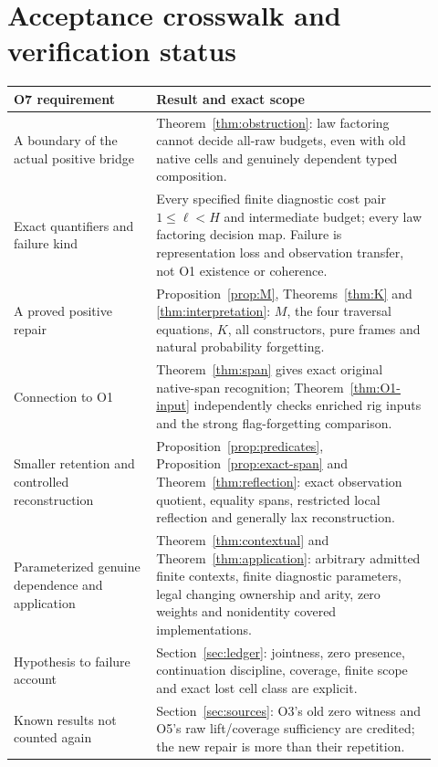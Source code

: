 \documentclass[11pt,a4paper]{article}
\theoremstyle{definition}
\begin{document}
\section{Acceptance crosswalk and verification status}\label{sec:acceptance}
\begin{longtable}{@{}p{0.31\linewidth}p{0.61\linewidth}@{}}
\toprule
O7 requirement & Result and exact scope\\
\midrule
\endhead
A boundary of the actual positive bridge &
Theorem~\ref{thm:obstruction}: law factoring cannot decide all-raw budgets,
even with old native cells and genuinely dependent typed composition.\\
Exact quantifiers and failure kind &
Every specified finite diagnostic cost pair $1\leq\ell<H$ and intermediate
budget; every law factoring decision map. Failure is representation loss
and observation transfer, not O1 existence or coherence.\\
A proved positive repair &
Proposition~\ref{prop:M}, Theorems~\ref{thm:K} and
\ref{thm:interpretation}: $M$, the four traversal equations, $K$, all
constructors, pure frames and natural probability forgetting.\\
Connection to O1 &
Theorem~\ref{thm:span} gives exact original native-span recognition;
Theorem~\ref{thm:O1-input} independently checks enriched rig inputs and
the strong flag-forgetting comparison.\\
Smaller retention and controlled reconstruction &
Proposition~\ref{prop:predicates}, Proposition~\ref{prop:exact-span} and
Theorem~\ref{thm:reflection}: exact observation quotient, equality spans,
restricted local reflection and generally lax reconstruction.\\
Parameterized genuine dependence and application &
Theorem~\ref{thm:contextual} and Theorem~\ref{thm:application}: arbitrary
admitted finite contexts, finite diagnostic parameters, legal changing
ownership and arity, zero weights and nonidentity covered implementations.\\
Hypothesis to failure account &
Section~\ref{sec:ledger}: jointness, zero presence, continuation discipline,
coverage, finite scope and exact lost cell class are explicit.\\
Known results not counted again &
Section~\ref{sec:sources}: O3's old zero witness and O5's raw lift/coverage
sufficiency are credited; the new repair is more than their repetition.\\
\bottomrule
\end{longtable}
\end{document}
